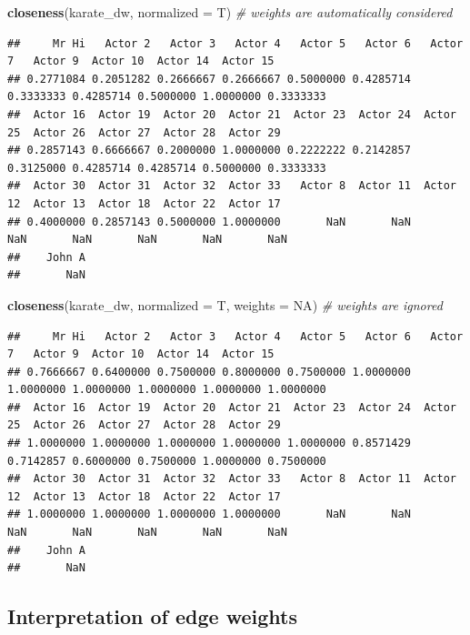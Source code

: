 \documentclass[
]{book}
\newenvironment{Shaded}{\begin{snugshade}}{\end{snugshade}}
\newcommand{\AttributeTok}[1]{\textcolor[rgb]{0.13,0.29,0.53}{#1}}
\newcommand{\CommentTok}[1]{\textcolor[rgb]{0.56,0.35,0.01}{\textit{#1}}}
\newcommand{\ConstantTok}[1]{\textcolor[rgb]{0.56,0.35,0.01}{#1}}
\newcommand{\FunctionTok}[1]{\textcolor[rgb]{0.13,0.29,0.53}{\textbf{#1}}}
\newcommand{\NormalTok}[1]{#1}
\begin{document}
\begin{Shaded}
\begin{Highlighting}[]
\FunctionTok{closeness}\NormalTok{(karate\_dw, }\AttributeTok{normalized =}\NormalTok{ T) }\CommentTok{\# weights are automatically considered}
\end{Highlighting}
\end{Shaded}

\begin{verbatim}
##     Mr Hi   Actor 2   Actor 3   Actor 4   Actor 5   Actor 6   Actor 7   Actor 9  Actor 10  Actor 14  Actor 15 
## 0.2771084 0.2051282 0.2666667 0.2666667 0.5000000 0.4285714 0.3333333 0.4285714 0.5000000 1.0000000 0.3333333 
##  Actor 16  Actor 19  Actor 20  Actor 21  Actor 23  Actor 24  Actor 25  Actor 26  Actor 27  Actor 28  Actor 29 
## 0.2857143 0.6666667 0.2000000 1.0000000 0.2222222 0.2142857 0.3125000 0.4285714 0.4285714 0.5000000 0.3333333 
##  Actor 30  Actor 31  Actor 32  Actor 33   Actor 8  Actor 11  Actor 12  Actor 13  Actor 18  Actor 22  Actor 17 
## 0.4000000 0.2857143 0.5000000 1.0000000       NaN       NaN       NaN       NaN       NaN       NaN       NaN 
##    John A 
##       NaN
\end{verbatim}

\begin{Shaded}
\begin{Highlighting}[]
\FunctionTok{closeness}\NormalTok{(karate\_dw, }\AttributeTok{normalized =}\NormalTok{ T, }\AttributeTok{weights =} \ConstantTok{NA}\NormalTok{) }\CommentTok{\# weights are ignored}
\end{Highlighting}
\end{Shaded}

\begin{verbatim}
##     Mr Hi   Actor 2   Actor 3   Actor 4   Actor 5   Actor 6   Actor 7   Actor 9  Actor 10  Actor 14  Actor 15 
## 0.7666667 0.6400000 0.7500000 0.8000000 0.7500000 1.0000000 1.0000000 1.0000000 1.0000000 1.0000000 1.0000000 
##  Actor 16  Actor 19  Actor 20  Actor 21  Actor 23  Actor 24  Actor 25  Actor 26  Actor 27  Actor 28  Actor 29 
## 1.0000000 1.0000000 1.0000000 1.0000000 1.0000000 0.8571429 0.7142857 0.6000000 0.7500000 1.0000000 0.7500000 
##  Actor 30  Actor 31  Actor 32  Actor 33   Actor 8  Actor 11  Actor 12  Actor 13  Actor 18  Actor 22  Actor 17 
## 1.0000000 1.0000000 1.0000000 1.0000000       NaN       NaN       NaN       NaN       NaN       NaN       NaN 
##    John A 
##       NaN
\end{verbatim}

\subsection{Interpretation of edge weights}\label{interpretation-of-edge-weights}
\end{document}
